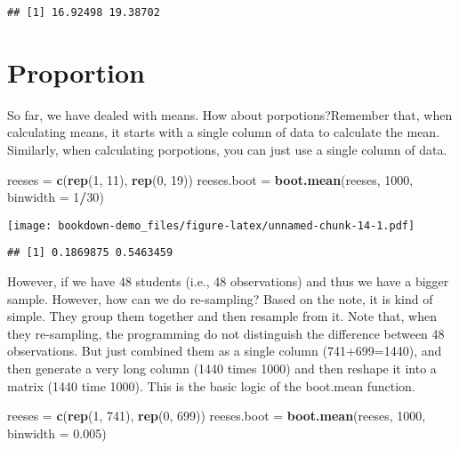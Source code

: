 \documentclass[]{book}
\newenvironment{Shaded}{\begin{snugshade}}{\end{snugshade}}
\newcommand{\DataTypeTok}[1]{\textcolor[rgb]{0.13,0.29,0.53}{#1}}
\newcommand{\DecValTok}[1]{\textcolor[rgb]{0.00,0.00,0.81}{#1}}
\newcommand{\FloatTok}[1]{\textcolor[rgb]{0.00,0.00,0.81}{#1}}
\newcommand{\KeywordTok}[1]{\textcolor[rgb]{0.13,0.29,0.53}{\textbf{#1}}}
\newcommand{\NormalTok}[1]{#1}
\newcommand{\OperatorTok}[1]{\textcolor[rgb]{0.81,0.36,0.00}{\textbf{#1}}}
\newcommand{\StringTok}[1]{\textcolor[rgb]{0.31,0.60,0.02}{#1}}
\begin{document}
\begin{verbatim}
## [1] 16.92498 19.38702
\end{verbatim}

\hypertarget{proportion}{%
\section{Proportion}\label{proportion}}

So far, we have dealed with means. How about porpotions?Remember that, when calculating means, it starts with a single column of data to calculate the mean. Similarly, when calculating porpotions, you can just use a single column of data.

\begin{Shaded}
\begin{Highlighting}[]
\NormalTok{reeses =}\StringTok{ }\KeywordTok{c}\NormalTok{(}\KeywordTok{rep}\NormalTok{(}\DecValTok{1}\NormalTok{, }\DecValTok{11}\NormalTok{), }\KeywordTok{rep}\NormalTok{(}\DecValTok{0}\NormalTok{, }\DecValTok{19}\NormalTok{))}
\NormalTok{reeses.boot =}\StringTok{ }\KeywordTok{boot.mean}\NormalTok{(reeses, }\DecValTok{1000}\NormalTok{, }\DataTypeTok{binwidth =} \DecValTok{1}\OperatorTok{/}\DecValTok{30}\NormalTok{)}
\end{Highlighting}
\end{Shaded}

\texttt{[image: bookdown-demo\_files/figure-latex/unnamed-chunk-14-1.pdf]}

\begin{verbatim}
## [1] 0.1869875 0.5463459
\end{verbatim}

However, if we have 48 students (i.e., 48 observations) and thus we have a bigger sample. However, how can we do re-sampling? Based on the note, it is kind of simple. They group them together and then resample from it. Note that, when they re-sampling, the programming do not distinguish the difference between 48 observations. But just combined them as a single column (741+699=1440), and then generate a very long column (1440 times 1000) and then reshape it into a matrix (1440 time 1000). This is the basic logic of the boot.mean function.

\begin{Shaded}
\begin{Highlighting}[]
\NormalTok{reeses =}\StringTok{ }\KeywordTok{c}\NormalTok{(}\KeywordTok{rep}\NormalTok{(}\DecValTok{1}\NormalTok{, }\DecValTok{741}\NormalTok{), }\KeywordTok{rep}\NormalTok{(}\DecValTok{0}\NormalTok{, }\DecValTok{699}\NormalTok{))}
\NormalTok{reeses.boot =}\StringTok{ }\KeywordTok{boot.mean}\NormalTok{(reeses, }\DecValTok{1000}\NormalTok{, }\DataTypeTok{binwidth =} \FloatTok{0.005}\NormalTok{)}
\end{Highlighting}
\end{Shaded}
\end{document}
